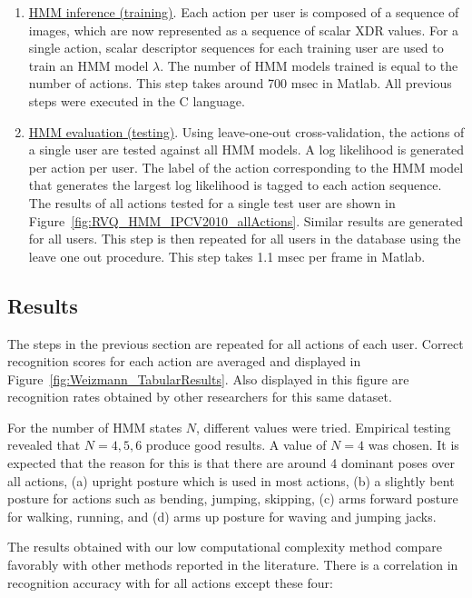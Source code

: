 \begin{Body}
\begin{enumerate}
\item \underline{HMM inference (training)}.  Each action per user is composed of a sequence of images, which are now represented as a sequence of scalar XDR values.  For a single action, scalar descriptor sequences for each training user are used to train an HMM model $\lambda$.  The number of HMM models trained is equal to the number of actions.  This step takes around 700 msec in Matlab.  All previous steps were executed in the C language.

\item \underline{HMM evaluation (testing)}.  Using leave-one-out cross-validation, the actions of a single user are tested against all HMM models.  A log likelihood is generated per action per user.  The label of the action corresponding to the HMM model that generates the largest log likelihood is tagged to each action sequence.  The results of all actions tested for a single test user are shown in Figure~\ref{fig:RVQ_HMM_IPCV2010_allActions}.  Similar results are generated for all users.  This step is then repeated for all users in the database using the leave one out procedure.  This step takes 1.1 msec per frame in Matlab.   
\end{enumerate}

\subsection{Results}
The steps in the previous section are repeated for all actions of each user.  Correct recognition scores for each action are averaged and displayed in Figure~\ref{fig:Weizmann_TabularResults}.  Also displayed in this figure are recognition rates obtained by other researchers for this same dataset.

For the number of HMM states $N$, different values were tried.  Empirical testing revealed that $N=4, 5, 6$ produce good results.  A value of $N=4$ was chosen.  It is expected that the reason for this is that there are around 4 dominant poses over all actions, (a) upright posture which is used in most actions, (b) a slightly bent posture for actions such as bending, jumping, skipping, (c) arms forward posture for walking, running, and (d) arms up posture for waving and jumping jacks.

The results obtained with our low computational complexity method compare favorably with other methods reported in the literature.  There is a correlation in recognition accuracy with \cite{2007_JNL_SpaceTimeShapes_Gorelick} for all actions except these four:  


\end{Body}
